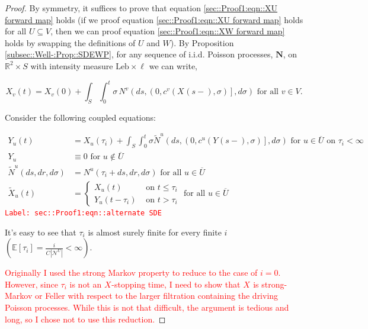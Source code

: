 \documentclass[12pt]{article}
\newcommand{\mb}{\mathbb}
\newcommand{\mc}{\mathcal}
\newcommand{\ov}{\overline}
\newcommand{\te}{\text}
\newcommand{\tr}{\textcolor{red}}
\newcommand{\labe}[1]{\tr{\texttt{Label: #1}}}
\newcommand{\ind}{\hspace{24pt}}
\newcommand{\ex}[1]{\mb{E}\left[#1\right]}			%
\renewcommand{\v}{v}							%
\newcommand{\vv}{u}								%
\renewcommand{\U}{U}							%
\newcommand{\UU}{W}								%
\renewcommand{\S}{S}							%
\newcommand{\s}{\sigma}							%
\renewcommand{\t}{t}							%
\renewcommand{\tt}{s}							%
\newcommand{\X}{X}								%
\newcommand{\IGr}{c}							%
\newcommand{\neigh}{\mc{N}}						%
\newcommand{\vind}[1]{^{#1}}					%
\newcommand{\cind}[1]{_{#1}}					%
\newcommand{\cl}{\ov}							%
\newcommand{\tp}[1]{(#1)}						%
\newcommand{\tip}[1]{#1}						%
\newcommand{\const}{C}							%
\newcommand{\poisses}{\mathbf{N}}				%
\newcommand{\poiss}{N}							%
\newcommand{\leb}{\te{Leb}}						%
\newcommand{\Sm}{\ell}							%
\renewcommand{\r}{r}							%
\newcommand{\alt}[1]{\widetilde{#1}}			%
\newcommand{\indx}[1]{_{#1}}					%
\newcommand{\XX}{Y}								%
\newcommand{\rt}{\tau}							%
\begin{document}
\begin{proof}
By symmetry, it suffices to prove that equation \ref{sec::Proof1:eqn::XU forward map} holds (if we proof equation \eqref{sec::Proof1:eqn::XU forward map} holds for all \(\U \subseteq V\), then we can proof equation \eqref{sec::Proof1:eqn::XW forward map} holds by swapping the definitions of \(\U\) and \(\UU\)). By Proposition \ref{subsec::Well-:Prop::SDEWP}, for any sequence of i.i.d. Poisson processes, \(\poisses\), on \(\mb{R}^2\times \S\) with intensity measure \(\leb\times\Sm\) we can write,

\[\X\cind{\v}\tp{\t} = \X\cind{\v}\tp{0} + \int_\S\int_0^\t \s\,\poiss\vind{\v}\left(d\tt,\left(0,\IGr\vind{\v}(\X\cind{}\tp{\tt-},\s)\right],d\s\right)\te{ for all } \v\in V.\]

Consider the following coupled equations:

\begin{align}
\XX\cind{\vv}\tp{\t} &= \X\cind{\vv}\tp{\rt\indx{i}} + \int_\S\int_0^\t \s\alt{\poiss}\vind{\vv}\left(d\tt,\left(0,\IGr\vind{\vv}(\XX\cind{}\tp{\tt-},\s)\right],d\s\right)\te{ for } \vv \in \cl{\U} \te{ on } \rt\indx{i} < \infty \label{sec::Proof1:eqn::alternate SDE}\\
\XX\cind{\vv}\tip{} &\equiv 0\te{ for } \vv\notin \cl{\U}\nonumber\\
\alt{\poiss}\vind{\vv}(d\tt,d\r,d\s) &= \poiss\vind{\vv}(\rt\indx{i} + d\tt,d\r,d\s) \te{ for all }\vv\in \cl{\U}\nonumber\\
\alt{\X}\cind{\vv}\tp{\t} &= \begin{cases}
\X\cind{\vv}\tp{\t} &\te{ on } \t \leq \rt\indx{i}\\
\XX\cind{\vv}\tp{\t - \rt\indx{i}} &\te{ on } \t > \rt\indx{i}
\end{cases} \te{ for all } \vv\in \cl{\U} \nonumber
\end{align}
\labe{sec::Proof1:eqn::alternate SDE}

It's easy to see that \(\rt\indx{i}\) is almost surely finite for every finite \(i\) \(\left(\ex{\rt\indx{i}} = \frac{i}{\const\indx{}|\neigh\vind{\U}|} < \infty\right)\). 

\ind \tr{Originally I used the strong Markov property to reduce to the case of \(i = 0\). However, since \(\rt\indx{i}\) is not an \(\X\cind{}\tip{}\)-stopping time, I need to show that \(\X\cind{}\tip{}\) is strong-Markov or Feller with respect to the larger filtration containing the driving Poisson processes. While this is not that difficult, the argument is tedious and long, so I chose not to use this reduction.}


\end{proof}
\end{document}
